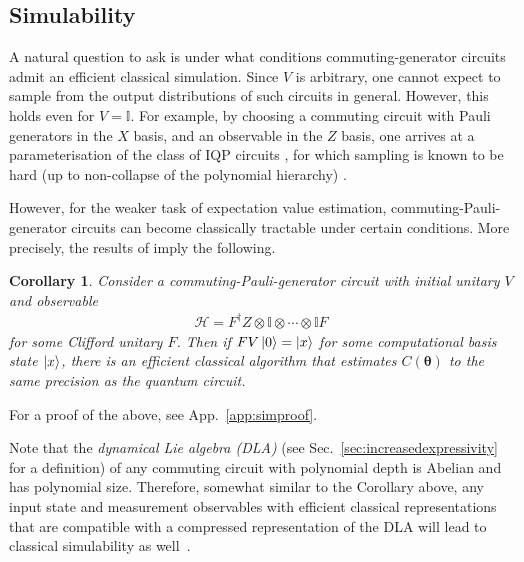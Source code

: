 \documentclass[a4paper,twocolumn,11pt,accepted=2025-09-06]{quantumarticle}
\newtheorem{corollary}{Corollary}
\renewcommand{\vec}{\boldsymbol}
\begin{document}
\subsection{Simulability}\label{sec:simulate}
A natural question to ask is under what conditions commuting-generator circuits admit an efficient classical simulation. Since $V$ is arbitrary, one cannot expect to sample from the output distributions of such circuits in general. However, this holds even for $V=\mathbb{I}$. For example, by choosing a commuting circuit with Pauli generators in the $X$ basis, and an observable in the $Z$ basis, one arrives at a parameterisation of the class of IQP circuits \cite{bremner2016average,ni2012commuting}, for which sampling is known to be hard (up to non-collapse of the polynomial hierarchy) \cite{bremner2016average}. 

However, for the weaker task of expectation value estimation, commuting-Pauli-generator circuits can become classically tractable under certain conditions. More precisely, the results of \cite{ni2012commuting} imply the following. 

%
\begin{corollary}\label{thm:sim}
    Consider a commuting-Pauli-generator circuit with initial unitary $V$ and observable
    \begin{align}
        \mathcal{H}=F^\dagger Z \otimes \mathbb{I}\otimes\cdots\otimes\mathbb{I} F
    \end{align}
    for some Clifford unitary $F$. 
    Then if $FV\ket{0}=\ket{x}$ for some computational basis state $\ket{x}$, there is an efficient classical algorithm that estimates $C(\vec{\theta})$ to the same precision as the quantum circuit.
\end{corollary}
%
For a proof of the above, see App.\ \ref{app:simproof}. 

Note that the \textit{dynamical Lie algebra (DLA)} (see Sec.~\ref{sec:increasedexpressivity} for a definition) of any commuting circuit with polynomial depth is Abelian and has polynomial size.
Therefore, somewhat similar to the Corollary above, any input state and measurement observables with efficient classical representations that are compatible with a compressed representation of the DLA will lead to classical simulability as well~\cite{goh2023,somma2005quantum}.
\end{document}
